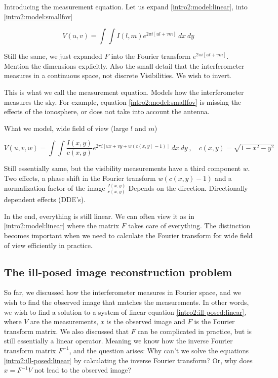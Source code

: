Introducing the measurement equation. Let us expand \eqref{intro2:model:linear}, into \eqref{intro2:model:smallfov}

\begin{equation}\label{intro2:model:smallfov}
V(u, v) = \int\int I(l, m)  e^{2 \pi i [ul+vm]} \: dx \: dy
\end{equation}

Still the same, we just expanded $F$ into the Fourier transform $e^{2 \pi i [ul+vm]}$. 
Mention the dimensions explicitly. Also the small detail that the interferometer measures in a continuous space, not discrete Visibilities.
We wish to invert.

This is what we call the measurement equation. Models how the interferometer measures the sky. For example, equation \eqref{intro2:model:smallfov} is missing the effects of the ionosphere, or does not take into account the antenna.

What we model, wide field of view (large $l$ and $m$)

\begin{equation}\label{intro2:model:widefov}
V(u, v, w) = \int\int  \frac{I(x, y)}{c(x, y)}  e^{2 \pi i [ux+vy+ w(c(x, y) - 1)]} \: dx \: dy \:,  \quad c(x,y) = \sqrt{1 - x^2 - y ^2}
\end{equation}

Still essentially same, but the visibility measurements have a third component $w$. 
Two effects, a phase shift in the Fourier transform $w(c(x, y) - 1)$ and a normalization factor of the image $\frac{I(x, y)}{c(x, y)}$
Depends on the direction. Directionally dependent effects (DDE's).


In the end, everything is still linear. We can often view it as in \eqref{intro2:model:linear} where the matrix $F$ takes care of everything.
The distinction becomes important when we need to calculate the Fourier transform for wide field of view efficiently in practice.



\subsection{The ill-posed image reconstruction problem}\label{intro2:ill-posed}
So far, we discussed how the interferometer measures in Fourier space, and we wish to find the observed image that matches the measurements. In other words, we wish to find a solution to a system of linear equation \eqref{intro2:ill-posed:linear}, where $V$ are the measurements, $x$ is the observed image and $F$ is the Fourier transform matrix. We also discussed that $F$ can be complicated in practice, but is still essentially a linear operator. Meaning we know how the inverse Fourier transform matrix $F^{-1}$, and the question arises: Why can't we solve the equations \eqref{intro2:ill-posed:linear} by calculating the inverse Fourier transform? Or, why does $x = F^{-1} V$ not lead to the observed image?

